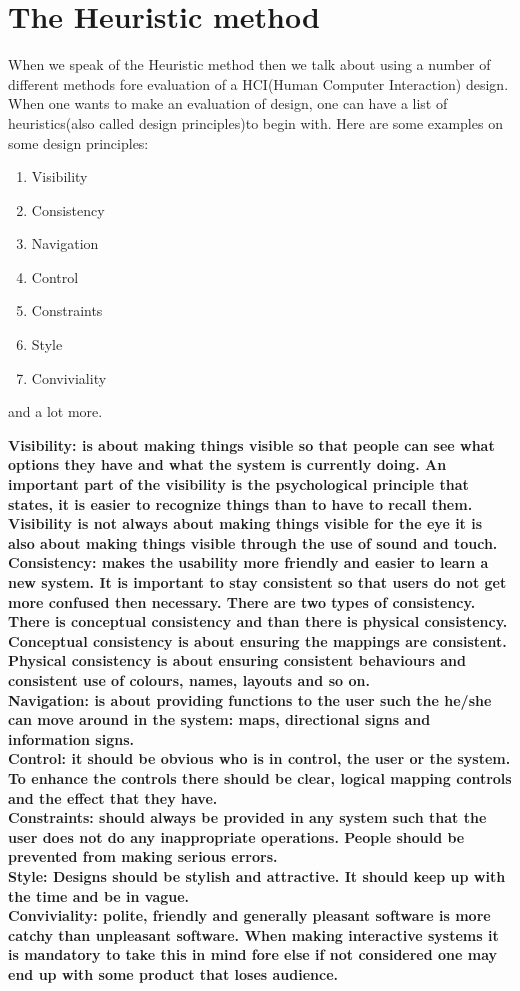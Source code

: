 \section{The Heuristic method}
When we speak of the Heuristic method then we talk about using a number of different methods fore evaluation of a HCI(Human Computer Interaction) design. When one wants to make an evaluation of design, one can have a list of heuristics(also called design principles)to begin with. Here are some examples on some design principles:
\begin{enumerate}
\item Visibility
\item Consistency
\item Navigation
\item Control
\item Constraints
\item Style
\item Conviviality
\end{enumerate}
and a lot more.

\bf{Visibility:} is about making things visible so that people can see what options they have and what the system is currently doing. An important part of the visibility is the psychological principle that states, it is easier to recognize things than to have to recall them. Visibility is not always about making things visible for the eye it is also about making things visible through the use of sound and touch.\\
\bf{Consistency:} makes the usability more friendly and easier to learn a new system. It is important to stay consistent so that users do not get more confused then necessary. There are two types of consistency. There is conceptual consistency and than there is physical consistency. Conceptual consistency is about ensuring the mappings are consistent. Physical consistency is about ensuring consistent behaviours and consistent use of colours, names, layouts and so on.\\
\bf{Navigation:} is about providing functions to the user such the he/she can move around in the system: maps, directional signs and information signs.\\ 
\bf{Control:} it should be obvious who is in control, the user or the system. To enhance the controls there should be clear, logical mapping controls and the effect that they have.\\
\bf{Constraints:} should always be provided in any system such that the user does not do any inappropriate operations. People should be prevented from making serious errors.\\ 
\bf{Style:} Designs should be stylish and attractive. It should keep up with the time and be in vague.\\ 
\bf{Conviviality:} polite, friendly and generally pleasant software is more catchy than unpleasant software. When making interactive systems it is mandatory to take this in mind fore else if not considered one may end up with some product that loses audience.

